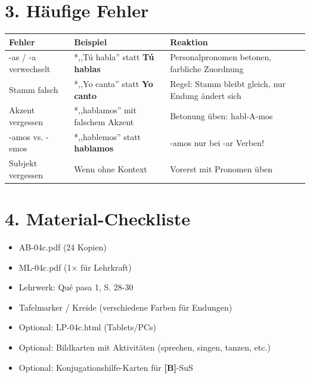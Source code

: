 \documentclass[11pt, a4paper]{article}
\newcommand{\fachfarbe}{spanisch}
\newcommand{\sequenz}{04}
\newcommand{\block}{c}
\newcommand{\lerngruppengroesse}{24}
\newcommand{\B}{\textcolor{basis}{\textbf{[B]}}}
\newcommand{\es}[1]{\textcolor{\fachfarbe}{\textbf{#1}}}
\begin{document}

\section*{3. Häufige Fehler}

\begin{fehlerbox}
\begin{tabularx}{\textwidth}{|l|X|X|}
\hline
\textbf{Fehler} & \textbf{Beispiel} & \textbf{Reaktion} \\
\hline
-as / -a verwechselt & *,,Tú habla'' statt \es{Tú hablas} & Personalpronomen betonen, farbliche Zuordnung \\
\hline
Stamm falsch & *,,Yo canta'' statt \es{Yo canto} & Regel: Stamm bleibt gleich, nur Endung ändert sich \\
\hline
Akzent vergessen & *,,hablamos'' mit falschem Akzent & Betonung üben: habl-A-mos \\
\hline
-amos vs. -emos & *,,hablemos'' statt \es{hablamos} & -amos nur bei -ar Verben! \\
\hline
Subjekt vergessen & Wenn ohne Kontext & Vorerst mit Pronomen üben \\
\hline
\end{tabularx}
\end{fehlerbox}


\section*{4. Material-Checkliste}

\begin{materialbox}
\begin{itemize}[label=$\square$]
    \item AB-\sequenz\block.pdf (\lerngruppengroesse{} Kopien)
    \item ML-\sequenz\block.pdf (1$\times$ für Lehrkraft)
    \item Lehrwerk: Qué pasa 1, S. 28-30
    \item Tafelmarker / Kreide (verschiedene Farben für Endungen)
    \item Optional: LP-\sequenz\block.html (Tablets/PCs)
    \item Optional: Bildkarten mit Aktivitäten (sprechen, singen, tanzen, etc.)
    \item Optional: Konjugationshilfe-Karten für \B{}-SuS
\end{itemize}
\end{materialbox}
\end{document}
